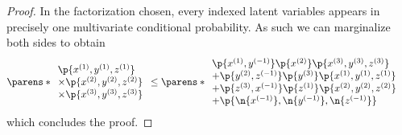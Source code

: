 \begin{widetext}
\begin{proof}
In the factorization chosen, every indexed latent variables appears in precisely one multivariate conditional probability. As such we can marginalize both sides to obtain
\begin{align}
&\parens*{\begin{array}{l}
  \p{ {x^{(1)}} , {y^{(1)}} , {z^{(1)}} }
   \\\times\p{ {x^{(2)}} , {y^{(2)}} , {z^{(2)}} }
   \\\times\p{ {x^{(3)}} , {y^{(3)}} , {z^{(3)}} }
\end{array}}
         \leq
 \parens*{\begin{array}{l}
    \p{ {x^{(1)}} , {y^{(-1)}} }\p{{x^{(2)}} }\p{ {x^{(3)}} , {y^{(3)}} , {z^{(3)}} }
\\ +\p{ {y^{(2)}} , {z^{(-1)}} }\p{{y^{(3)}} }\p{ {x^{(1)}} , {y^{(1)}} , {z^{(1)}} }
\\ +\p{ {z^{(3)}} , {x^{(-1)}} }\p{{z^{(1)}} }\p{ {x^{(2)}} , {y^{(2)}} , {z^{(2)}} }
\\ + \p{ \n{x^{(-1)}} , \n{y^{(-1)}} , \n{z^{(-1)}} }
\end{array}}
\end{align}
which concludes the proof.
\end{proof}



\end{widetext}
